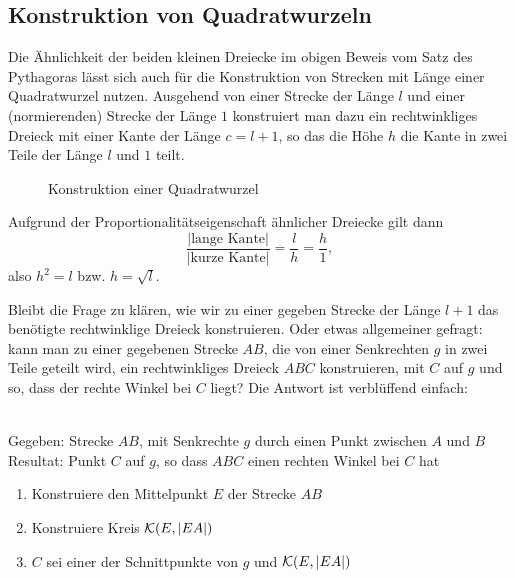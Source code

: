 \subsection*{Konstruktion von Quadratwurzeln}

Die Ähnlichkeit der beiden kleinen Dreiecke im obigen Beweis vom Satz des Pythagoras lässt sich auch
für die Konstruktion von Strecken mit Länge einer Quadratwurzel nutzen.  Ausgehend von einer Strecke
der Länge $l$ und einer (normierenden) Strecke der Länge $1$ konstruiert man dazu ein rechtwinkliges
Dreieck mit einer Kante der Länge $c=l+1$, so das die Höhe $h$ die Kante in zwei Teile der Länge $l$
und $1$ teilt.

\begin{figure}[h]
    
    \caption{Konstruktion einer Quadratwurzel}
\end{figure}

Aufgrund der Proportionalitätseigenschaft ähnlicher Dreiecke gilt dann
$$
    \frac{|\mbox{lange Kante}|}{|\mbox{kurze Kante}|}=\frac{l}{h}=\frac{h}{1},
$$
also $h^2=l$ bzw. $h=\sqrt{l}$.


Bleibt die Frage zu klären, wie wir zu einer gegeben Strecke der Länge $l+1$ das benötigte
rechtwinklige Dreieck konstruieren. Oder etwas allgemeiner gefragt: kann man zu einer gegebenen
Strecke $AB$, die von einer Senkrechten $g$ in zwei Teile geteilt wird, ein rechtwinkliges Dreieck
$ABC$ konstruieren, mit $C$ auf $g$ und so, dass der rechte Winkel bei $C$ liegt? Die Antwort ist
verblüffend einfach:

\begin{konst}\ \\
    Gegeben: Strecke $AB$, mit Senkrechte $g$ %
        durch einen Punkt zwischen $A$ und $B$\\
    Resultat: Punkt $C$ auf $g$, so dass $ABC$ einen rechten Winkel bei $C$ hat
    \renewcommand{\labelenumi}{\arabic{enumi}.} %
    \begin{enumerate}
        \item Konstruiere den Mittelpunkt $E$ der Strecke $AB$
        \item Konstruiere Kreis ${\mathcal K}(E,|EA|)$
        \item $C$ sei einer der Schnittpunkte von $g$ und ${\mathcal K}(E,|EA|)$
    \end{enumerate}
\end{konst}

